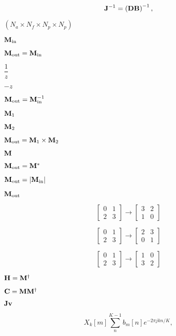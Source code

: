 \documentclass{article}
\begin{document}
\[{\bf J}^{-1} = \left({\bf D}{\bf B}\right)^{-1},\]
\pagebreak

$(N_a \times N_f \times N_p \times N_p)$
\pagebreak

${\bf M}_\text{in}$
\pagebreak

${\bf M}_\text{out} = {\bf M}_\text{in}$
\pagebreak

$\dfrac{1}{z}$
\pagebreak

$-z$
\pagebreak

${\bf M}_\text{out} = {\bf M}_\text{in}^{-1}$
\pagebreak

${\bf M}_1$
\pagebreak

${\bf M}_2$
\pagebreak

${\bf M}_\text{out} = {\bf M}_1 \times {\bf M}_2$
\pagebreak

${\bf M}$
\pagebreak

${\bf M}_\text{out} = {\bf M}^\ast$
\pagebreak

${\bf M}_\text{out} = |{\bf M}_\text{in}|$
\pagebreak

${\bf M}_\text{out}$
\pagebreak

\[\begin{bmatrix} 0 & 1 \\ 2 & 3\end{bmatrix} \rightarrow \begin{bmatrix} 3 & 2 \\ 1 & 0 \end{bmatrix}\]
\pagebreak

\[\begin{bmatrix} 0 & 1 \\ 2 & 3\end{bmatrix} \rightarrow \begin{bmatrix} 2 & 3 \\ 0 & 1 \end{bmatrix}\]
\pagebreak

\[\begin{bmatrix} 0 & 1 \\ 2 & 3\end{bmatrix} \rightarrow \begin{bmatrix} 1 & 0 \\ 3 & 2 \end{bmatrix}\]
\pagebreak

${\bf H} = {\bf M}^\dagger$
\pagebreak

${\bf C} = {\bf M}{\bf M}^\dagger$
\pagebreak

${\bf J}{\bf v}$
\pagebreak

\[ X_k[m] \sum_n^{K-1} b_m[n] e^{-2\pi jkn/K}, \]
\pagebreak
\end{document}
